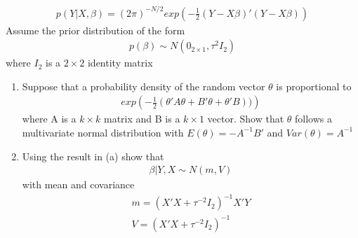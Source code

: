 \documentclass[12pt,onecolumn]{article}
\begin{document}
\begin{enumerate}
  \begin{align}
  p(Y|X,\beta) = (2\pi)^{-N/2}exp \left( -\frac{1}{2} (Y-X\beta)'(Y-X\beta) \right) 
  \end{align}
  Assume the prior distribution of the form 
  \begin{align}
  p(\beta)\sim N(0_{2\times1},\tau^2I_2)
  \end{align}
  where $I_2$ is a $2\times2$ identity matrix
  \begin{enumerate}
    \item Suppose that a probability density of the random vector $\theta$ is proportional to
    \begin{align}
    exp \left( -\frac{1}{2} (\theta'A\theta+B'\theta+\theta'B)) \right) 
    \end{align}
    where A is a $k\times k$ matrix and B is a $k\times 1$ vector. Show that $\theta$ follows a multivariate normal distribution with
    $E(\theta)= - A^{-1}B'$ and $Var(\theta)=A^{-1}$
    \item  Using the result in (a) show that
    \begin{align}
    \beta|Y,X \sim N(m,V)
    \end{align}
    with mean and covariance
      \begin{align}
      m=(X'X + \tau^{-2} I_2)^{-1}X'Y \\ 
      V=(X'X + \tau^{-2} I_2)^{-1}
      \end{align}
  

\end{enumerate}
\end{enumerate}
\end{document}
